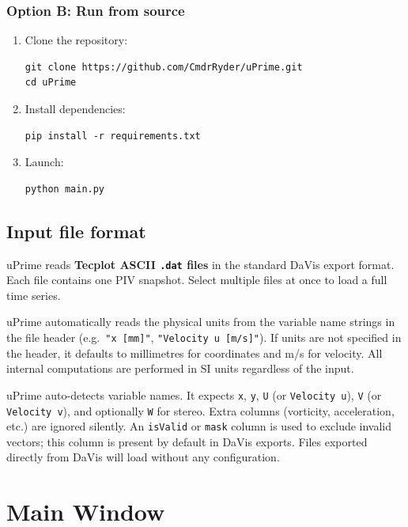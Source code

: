 \documentclass[11pt, a4paper]{report}
\begin{document}
\subsection{Option B: Run from source}

\begin{enumerate}[leftmargin=1.5em]
  \item Clone the repository:
\begin{verbatim}
git clone https://github.com/CmdrRyder/uPrime.git
cd uPrime
\end{verbatim}
  \item Install dependencies:
\begin{verbatim}
pip install -r requirements.txt
\end{verbatim}
  \item Launch:
\begin{verbatim}
python main.py
\end{verbatim}
\end{enumerate}

\section{Input file format}

uPrime reads \textbf{Tecplot ASCII \texttt{.dat} files} in the standard DaVis export format. Each file contains one PIV snapshot. Select multiple files at once to load a full time series.

uPrime automatically reads the physical units from the variable name strings in the file header (e.g.\ \texttt{"x [mm]"}, \texttt{"Velocity u [m/s]"}). If units are not specified in the header, it defaults to millimetres for coordinates and m/s for velocity. All internal computations are performed in SI units regardless of the input.

\begin{notebox}
uPrime auto-detects variable names. It expects \texttt{x}, \texttt{y}, \texttt{U} (or \texttt{Velocity u}), \texttt{V} (or \texttt{Velocity v}), and optionally \texttt{W} for stereo. Extra columns (vorticity, acceleration, etc.) are ignored silently. An \texttt{isValid} or \texttt{mask} column is used to exclude invalid vectors; this column is present by default in DaVis exports. Files exported directly from DaVis will load without any configuration.
\end{notebox}

\chapter{Main Window}
\label{ch:main}
\end{document}
